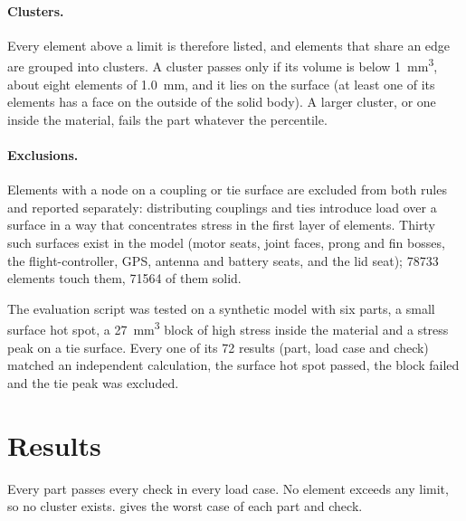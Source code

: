 \paragraph{Clusters.} Every element above a limit is therefore listed, and elements that share an edge are grouped into clusters. A cluster passes only if its volume is below \SI{1}{mm^3}, about eight elements of \SI{1.0}{mm}, and it lies on the surface (at least one of its elements has a face on the outside of the solid body). A larger cluster, or one inside the material, fails the part whatever the percentile.

\paragraph{Exclusions.} Elements with a node on a coupling or tie surface are excluded from both rules and reported separately: distributing couplings and ties introduce load over a surface in a way that concentrates stress in the first layer of elements. Thirty such surfaces exist in the model (motor seats, joint faces, prong and fin bosses, the flight-controller, GPS, antenna and battery seats, and the lid seat); \num{78733} elements touch them, \num{71564} of them solid.

The evaluation script was tested on a synthetic model with six parts, a small surface hot spot, a \SI{27}{mm^3} block of high stress inside the material and a stress peak on a tie surface. Every one of its 72 results (part, load case and check) matched an independent calculation, the surface hot spot passed, the block failed and the tie peak was excluded.

\section{Results}\label{sec:strength-results}

Every part passes every check in every load case. No element exceeds any limit, so no cluster exists.  gives the worst case of each part and check.

